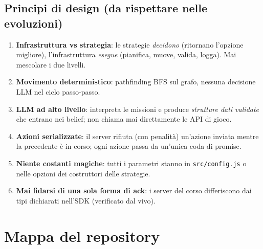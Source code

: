 \documentclass[11pt,a4paper]{article}
\newcommand{\file}[1]{\texttt{#1}}
\begin{document}
\subsection{Principi di design (da rispettare nelle evoluzioni)}

\begin{enumerate}
  \item \textbf{Infrastruttura vs strategia}: le strategie \emph{decidono}
    (ritornano l'opzione migliore), l'infrastruttura \emph{esegue}
    (pianifica, muove, valida, logga). Mai mescolare i due livelli.
  \item \textbf{Movimento deterministico}: pathfinding BFS sul grafo,
    nessuna decisione LLM nel ciclo passo-passo.
  \item \textbf{LLM ad alto livello}: interpreta le missioni e produce
    \emph{strutture dati validate} che entrano nei belief; non chiama mai
    direttamente le API di gioco.
  \item \textbf{Azioni serializzate}: il server rifiuta (con penalità)
    un'azione inviata mentre la precedente è in corso; ogni azione passa
    da un'unica coda di promise.
  \item \textbf{Niente costanti magiche}: tutti i parametri stanno in
    \file{src/config.js} o nelle opzioni dei costruttori delle strategie.
  \item \textbf{Mai fidarsi di una sola forma di ack}: i server del corso
    differiscono dai tipi dichiarati nell'SDK (verificato dal vivo).
\end{enumerate}

\section{Mappa del repository}
\end{document}
